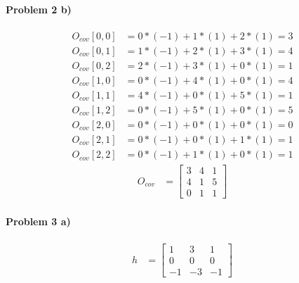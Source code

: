 \documentclass[11pt]{article}
\begin{document}
\paragraph{\noindent\textbf{\LARGE{Problem 2 b)}}}


\begin{equation*}
\begin{split}
    O_{cov}[0,0] & = 0*(-1) + 1*(1) + 2*(1) = 3 \\ 
    O_{cov}[0,1] & = 1*(-1) + 2*(1) + 3*(1) = 4 \\ 
    O_{cov}[0,2] & = 2*(-1) + 3*(1) + 0*(1) = 1 \\ 
    O_{cov}[1,0] & = 0*(-1) + 4*(1) + 0*(1) = 4 \\ 
    O_{cov}[1,1] & = 4*(-1) + 0*(1) + 5*(1) = 1 \\ 
    O_{cov}[1,2] & = 0*(-1) + 5*(1) + 0*(1) = 5 \\ 
    O_{cov}[2,0] & = 0*(-1) + 0*(1) + 0*(1) = 0 \\ 
    O_{cov}[2,1] & = 0*(-1) + 0*(1) + 1*(1) = 1 \\ 
    O_{cov}[2,2] & = 0*(-1) + 1*(1) + 0*(1) = 1 
\end{split}
\end{equation*}
\begin{equation*}
\begin{split}
O_{cov} & =  
\begin{bmatrix} 3 &4 &1 \\ 4 &1 &5 \\ 0 &1 &1 \end{bmatrix} 
\end{split}
\end{equation*}

\paragraph{\noindent\textbf{\LARGE{Problem 3 a)}}}

\begin{equation*}
\begin{split}
h & =  
\begin{bmatrix} 1  &3 &1 \\ 0 &0 &0 \\ -1 &-3 &-1 \end{bmatrix} 
\end{split}
\end{equation*}
\end{document}
